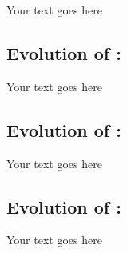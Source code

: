 \documentclass[a4paper, 11pt]{report}
\begin{document}
Your text goes here

\subsection{Evolution of \majB: \studB}

Your text goes here

\subsection{Evolution of \majC: \studC}

Your text goes here

\subsection{Evolution of \majD: \studD}

Your text goes here




\newpage



\end{document}
